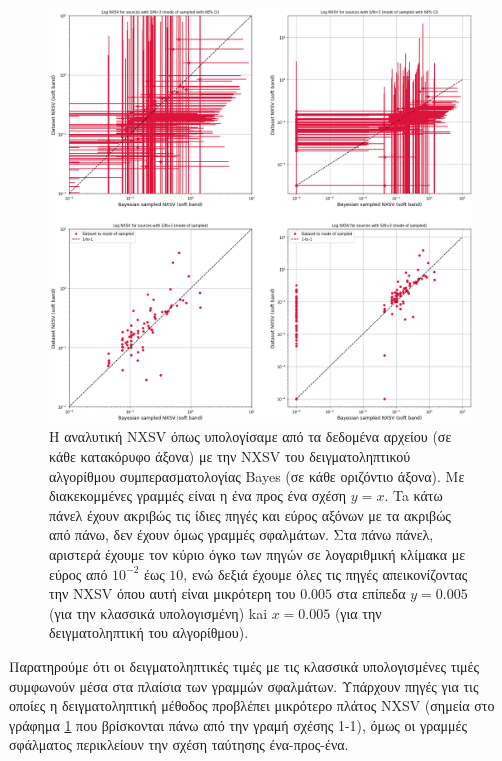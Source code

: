 \begin{figure}  \includegraphics[width=1.12\linewidth]{Figures/Sampled NXSV trunc.png} \caption{H αναλυτική \textlatin{NXSV} όπως υπολογίσαμε από τα δεδομένα αρχείου (σε κάθε κατακόρυφο άξονα) με την \textlatin{NXSV} του δειγματοληπτικού αλγορίθμου συμπερασματολογίας \textlatin{Bayes} (σε κάθε οριζόντιο άξονα). Με διακεκομμένες γραμμές είναι η ένα προς ένα σχέση $y=x$. Ta κάτω πάνελ έχουν ακριβώς τις ίδιες πηγές και εύρος αξόνων με τα ακριβώς από πάνω, δεν έχουν όμως γραμμές σφαλμάτων. Στα πάνω πάνελ, αριστερά έχουμε τον κύριο όγκο των πηγών σε λογαριθμική κλίμακα με εύρος από $10^{-2}$ έως $10$, ενώ δεξιά έχουμε όλες τις πηγές απεικονίζοντας την \textlatin{NXSV} όπου αυτή είναι μικρότερη του $0.005$ στα επίπεδα $y=0.005$ (για την κλασσικά υπολογισμένη) kai $x=0.005$ (για την δειγματοληπτική του αλγορίθμου).} \label{fig:SampledNXSV} \end{figure}

Παρατηρούμε ότι οι δειγματοληπτικές τιμές με τις κλασσικά υπολογισμένες τιμές συμφωνούν μέσα στα πλαίσια των γραμμών σφαλμάτων. Υπάρχουν πηγές για τις οποίες η δειγματοληπτική μέθοδος προβλέπει μικρότερο πλάτος \textlatin{NXSV} (σημεία στο γράφημα \ref{fig:SampledNXSV} που βρίσκονται πάνω από την γραμή σχέσης 1-1), όμως οι γραμμές σφάλματος περικλείουν την σχέση ταύτησης ένα-προς-ένα.

